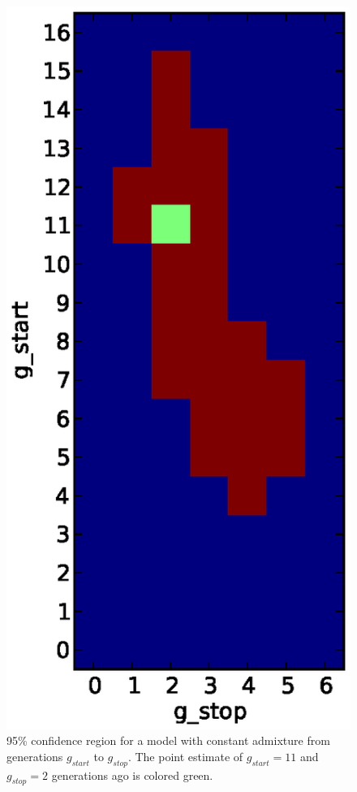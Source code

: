 \documentclass[11pt]{amsart}
\begin{document}
\newpage
\begin{figure}[htp!]
  \begin{center}
    \includegraphics[scale=.6]{ci.eps}
    \caption{95\% confidence region for a model with constant admixture from generations $g_{start}$ to $g_{stop}$. The point estimate of $g_{start}=11$ and $g_{stop}=2$ generations ago is colored green.}
    \label{ci}
  \end{center}
\end{figure}
\end{document}

